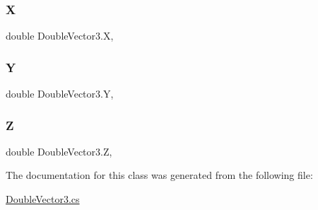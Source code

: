 \subsubsection{\texorpdfstring{X}{X}}
{\footnotesize\ttfamily double Double\+Vector3.\+X\hspace{0.3cm}{\ttfamily [get]}, {\ttfamily [set]}}

\mbox{\label{class_double_vector3_a47fffe514be07e27f35e24614f2dff89}} 
\subsubsection{\texorpdfstring{Y}{Y}}
{\footnotesize\ttfamily double Double\+Vector3.\+Y\hspace{0.3cm}{\ttfamily [get]}, {\ttfamily [set]}}

\mbox{\label{class_double_vector3_adcedb2cef768d9ab7d10f27f58da9d35}} 
\subsubsection{\texorpdfstring{Z}{Z}}
{\footnotesize\ttfamily double Double\+Vector3.\+Z\hspace{0.3cm}{\ttfamily [get]}, {\ttfamily [set]}}



The documentation for this class was generated from the following file\+:\begin{DoxyCompactItemize}
\item 
\mbox{\hyperlink{_double_vector3_8cs}{Double\+Vector3.\+cs}}\end{DoxyCompactItemize}
